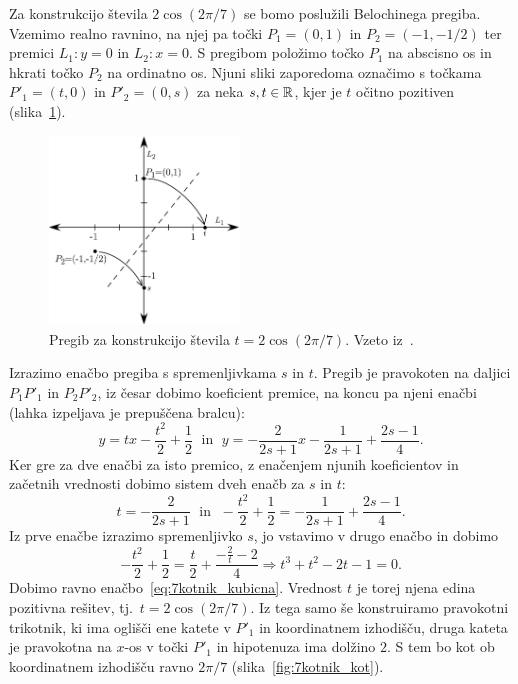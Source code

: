Za konstrukcijo števila $2 \cos(2 \pi / 7)$ se bomo poslužili Belochinega pregiba. Vzemimo realno ravnino, na njej pa točki $P_1 = (0,1)$ in $P_2 = (-1, -1/2)$ ter premici $L_1 : y=0$ in $L_2: x=0$. S pregibom položimo točko $P_1$ na abscisno os in hkrati točko $P_2$ na ordinatno os. Njuni sliki zaporedoma označimo s točkama $P'_1 = (t,0)$ in $P'_2 = (0,s)$ za neka $s, t \in \mathbb R$, kjer je $t$ očitno pozitiven (slika~\ref{fig:7kotnik_pregib}).

\begin{figure}[h]
    \centering
    \includegraphics[width=0.45\textwidth]{images/n-kotniki/7kotnik_pregib.png}
    \caption[Pregib za konstrukcijo sedemkotnika]{Pregib za konstrukcijo števila $t = 2 \cos(2 \pi / 7)$. Vzeto iz~\cite[str.\ 184]{hull2009}.}
    \label{fig:7kotnik_pregib}
\end{figure}

Izrazimo enačbo pregiba s spremenljivkama $s$ in $t$. Pregib je pravokoten na daljici $P_1 P'_1$ in $P_2 P'_2$, iz česar dobimo koeficient premice, na koncu pa njeni enačbi (lahka izpeljava je prepuščena bralcu):
\begin{equation*}
    y = tx - \frac{t^2}{2} + \frac{1}{2} \; \text{ in } \; y = -\frac{2}{2s+1}x - \frac{1}{2s+1} + \frac{2s-1}{4}.
\end{equation*}
Ker gre za dve enačbi za isto premico, z enačenjem njunih koeficientov in začetnih vrednosti dobimo sistem dveh enačb za $s$ in $t$:
\begin{equation*}
    t = - \frac{2}{2s+1} \; \text{ in } \; - \frac{t^2}{2} + \frac{1}{2} = - \frac{1}{2s+1} + \frac{2s-1}{4}.
\end{equation*}
Iz prve enačbe izrazimo spremenljivko $s$, jo vstavimo v drugo enačbo in dobimo
\begin{equation*}
    - \frac{t^2}{2} + \frac{1}{2} = \frac{t}{2} + \frac{-\frac{2}{t}-2}{4} \Rightarrow t^3 + t^2 - 2t - 1 = 0.
\end{equation*}
Dobimo ravno enačbo~\ref{eq:7kotnik_kubicna}. Vrednost $t$ je torej njena edina pozitivna rešitev, tj.\ $t = 2 \cos(2 \pi / 7)$. Iz tega samo še konstruiramo pravokotni trikotnik, ki ima oglišči ene katete v $P'_1$ in koordinatnem izhodišču, druga kateta je pravokotna na $x$-os v točki $P'_1$ in hipotenuza ima dolžino $2$. S tem bo kot ob koordinatnem izhodišču ravno $2 \pi /7$ (slika~\ref{fig:7kotnik_kot}).

